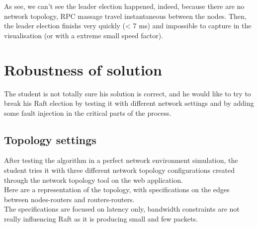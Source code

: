 \documentclass{eplmastersthesis}
\begin{document}
        As see, we can't see the leader election happened, indeed, because there are no network topology,
        RPC massage travel instantaneous between the nodes. Then, the leader election finishs very quickly (< 7 ms) and impossible 
        to capture in the visualisation (or with a extreme small speed factor).

      \section{Robustness of solution}

        The student is not totally sure his solution is correct, and he would
        like to try to break his Raft election by testing it with different
        network settings and by adding some fault injection in the critical
        parts of the process.

        \subsection{Topology settings}

          After testing the algorithm in a perfect network environment
          simulation, the student tries it with three different network
          topology configurations created through the network topology tool on
          the web application.\\
          Here are a representation of the topology, with specifications on
          the edges between nodes-routers and routers-routers.\\
          The specifications are focused on latency only, bandwidth constraints
          are not really influencing Raft as it is producing small and few
          packets.
\end{document}
